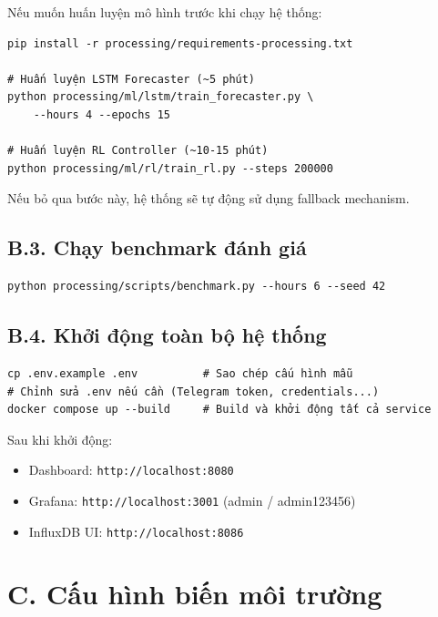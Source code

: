 Nếu muốn huấn luyện mô hình trước khi chạy hệ thống:

\begin{verbatim}
pip install -r processing/requirements-processing.txt

# Huấn luyện LSTM Forecaster (~5 phút)
python processing/ml/lstm/train_forecaster.py \
    --hours 4 --epochs 15

# Huấn luyện RL Controller (~10-15 phút)
python processing/ml/rl/train_rl.py --steps 200000
\end{verbatim}

Nếu bỏ qua bước này, hệ thống sẽ tự động sử dụng fallback mechanism.

\subsection*{B.3. Chạy benchmark đánh giá}

\begin{verbatim}
python processing/scripts/benchmark.py --hours 6 --seed 42
\end{verbatim}

\subsection*{B.4. Khởi động toàn bộ hệ thống}

\begin{verbatim}
cp .env.example .env          # Sao chép cấu hình mẫu
# Chỉnh sửa .env nếu cần (Telegram token, credentials...)
docker compose up --build     # Build và khởi động tất cả service
\end{verbatim}

Sau khi khởi động:
\begin{itemize}
  \item Dashboard: \texttt{http://localhost:8080}
  \item Grafana: \texttt{http://localhost:3001} (admin / admin123456)
  \item InfluxDB UI: \texttt{http://localhost:8086}
\end{itemize}

\section*{C. Cấu hình biến môi trường}

